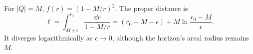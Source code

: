 \begin{enumerate}[leftmargin=2.8em,itemsep=1.2em]
For \(|Q|=M\), \(f(r)=(1-M/r)^2\).  The proper distance is
\[
 \ell=\int_{M+\epsilon}^{r_0}\frac{\dd r}{1-M/r}
 =(r_0-M-\epsilon)+M\ln\frac{r_0-M}{\epsilon}.
\]
It diverges logarithmically as \(\epsilon\to0\), although the horizon's
areal radius remains \(M\).
\end{enumerate}
